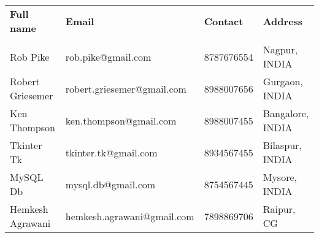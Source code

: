 \documentclass{article}%
\begin{document}
%
\normalsize%
\renewcommand{\arraystretch}{1.5}%
\begin{longtabu}{X[l] X[2l] X[r] X[r]}%
%
\textbf{Full name}&\textbf{Email}&\textbf{Contact}&\textbf{Address}\\%
&&&\\%
\hline%
%
Rob Pike&rob.pike@gmail.com&8787676554&Nagpur, INDIA\\%
%
Robert Griesemer&robert.griesemer@gmail.com&8988007656&Gurgaon, INDIA\\%
%
Ken Thompson&ken.thompson@gmail.com&8988007455&Bangalore, INDIA\\%
%
Tkinter Tk&tkinter.tk@gmail.com&8934567455&Bilaspur, INDIA\\%
%
MySQL Db&mysql.db@gmail.com&8754567445&Mysore, INDIA\\%
%
Hemkesh Agrawani&hemkesh.agrawani@gmail.com&7898869706&Raipur, CG\\%
\end{longtabu}%
\end{document}
